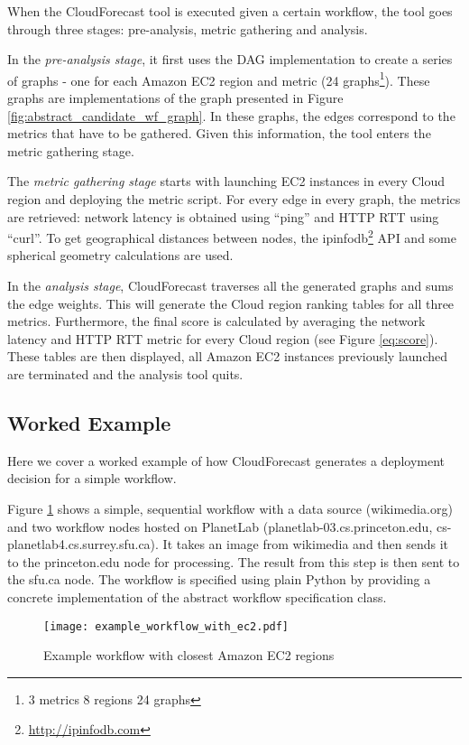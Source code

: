 \documentclass[10pt, conference, compsocconf]{IEEEtran}
\newcommand{\sysname}{CloudForecast\xspace}
\begin{document}
When the \sysname tool is executed given a certain workflow, the tool goes through three stages: pre-analysis, metric gathering and analysis.

In the \emph{pre-analysis stage}, it first uses the DAG implementation to create a series of graphs - one for each Amazon EC2 region and metric (24 graphs\footnote{3 metrics  8 regions  24 graphs}). These graphs are implementations of the graph presented in Figure \ref{fig:abstract_candidate_wf_graph}. In these graphs, the edges correspond to the metrics that have to be gathered. Given this information, the tool enters the metric gathering stage.

The \emph{metric gathering stage} starts with launching EC2 instances in every Cloud region and deploying the metric script. For every edge in every graph, the metrics are retrieved: network latency is obtained using ``ping'' and HTTP RTT using ``curl''. To get geographical distances between nodes, the ipinfodb\footnote{\url{http://ipinfodb.com}} API and some spherical geometry calculations are used.

In the \emph{analysis stage}, \sysname traverses all the generated graphs and sums the edge weights. This will generate the Cloud region ranking tables for all three metrics. Furthermore, the final score is calculated by averaging the network latency and HTTP RTT metric for every Cloud region (see Figure \ref{eq:score}). These tables are then displayed, all Amazon EC2 instances previously launched are terminated and the analysis tool quits.

\subsection{Worked Example}
Here we cover a worked example of how \sysname generates a deployment decision for a simple workflow.





Figure \ref{fig:example_workflow_with_ec2} shows a simple, sequential workflow with a data source (wikimedia.org) and two workflow nodes hosted on PlanetLab (planetlab-03.cs.princeton.edu, cs-planetlab4.cs.surrey.sfu.ca). It takes an image from wikimedia and then sends it to the princeton.edu node for processing. The result from this step is then sent to the sfu.ca node. The workflow is specified using plain Python by providing a concrete implementation of the abstract workflow specification class.


\begin{figure}[!t]
\centering
\texttt{[image: example\_workflow\_with\_ec2.pdf]}

\caption{Example workflow with closest Amazon EC2 regions}
\label{fig:example_workflow_with_ec2}
\end{figure}
\end{document}
